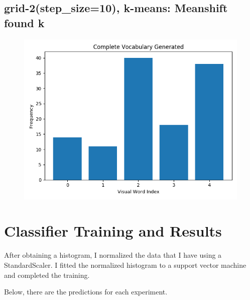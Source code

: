 
\subsection*{grid-2(step\_size=10), k-means: Meanshift found k}
\begin{figure}[H]
    \centering
    \includegraphics[scale = 0.5]{images/bow-stp-10-kmeanshift.png}
\end{figure}



\section*{Classifier Training and Results}

After obtaining a histogram, I normalized the data that I have using a
StandardScaler. I fitted the normalized histogram to a support vector machine
and completed the training.

Below, there are the predictions for each experiment.


